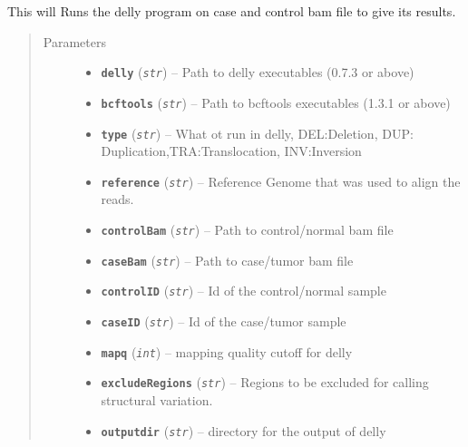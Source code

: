 \documentclass[letterpaper,10pt,english]{sphinxmanual}
\begin{document}
\begin{fulllineitems}
\label{iCallSV:iCallSV.Run_Delly.run}
This will Runs the delly program on case and control bam file to give its
results.
\begin{quote}\begin{description}
\item[{Parameters}] \leavevmode\begin{itemize}
\item {} 
\textbf{\texttt{delly}} (\emph{\texttt{str}}) -- Path to delly executables (0.7.3 or above)

\item {} 
\textbf{\texttt{bcftools}} (\emph{\texttt{str}}) -- Path to bcftools executables (1.3.1 or above)

\item {} 
\textbf{\texttt{type}} (\emph{\texttt{str}}) -- What ot run in delly, DEL:Deletion, DUP: Duplication,TRA:Translocation, INV:Inversion

\item {} 
\textbf{\texttt{reference}} (\emph{\texttt{str}}) -- Reference Genome that was used to align the reads.

\item {} 
\textbf{\texttt{controlBam}} (\emph{\texttt{str}}) -- Path to control/normal bam file

\item {} 
\textbf{\texttt{caseBam}} (\emph{\texttt{str}}) -- Path to case/tumor bam file

\item {} 
\textbf{\texttt{controlID}} (\emph{\texttt{str}}) -- Id of the control/normal sample

\item {} 
\textbf{\texttt{caseID}} (\emph{\texttt{str}}) -- Id of the case/tumor sample

\item {} 
\textbf{\texttt{mapq}} (\emph{\texttt{int}}) -- mapping quality cutoff for delly

\item {} 
\textbf{\texttt{excludeRegions}} (\emph{\texttt{str}}) -- Regions to be excluded for calling structural variation.

\item {} 
\textbf{\texttt{outputdir}} (\emph{\texttt{str}}) -- directory for the output of delly


\end{itemize}
\end{description}
\end{quote}
\end{fulllineitems}
\end{document}
